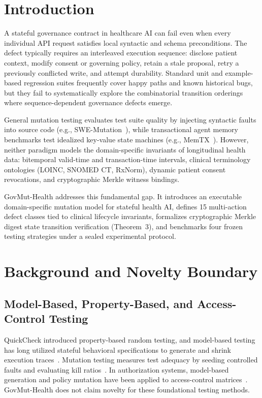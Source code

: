\documentclass[runningheads]{llncs}
\begin{document}
\section{Introduction}
A stateful governance contract in healthcare AI can fail even when every individual API request satisfies local syntactic and schema preconditions. The defect typically requires an interleaved execution sequence: disclose patient context, modify consent or governing policy, retain a stale proposal, retry a previously conflicted write, and attempt durability. Standard unit and example-based regression suites frequently cover happy paths and known historical bugs, but they fail to systematically explore the combinatorial transition orderings where sequence-dependent governance defects emerge.

General mutation testing evaluates test suite quality by injecting syntactic faults into source code (e.g., SWE-Mutation~\cite{swemutation}), while transactional agent memory benchmarks test idealized key-value state machines (e.g., MemTX~\cite{memtx}). However, neither paradigm models the domain-specific invariants of longitudinal health data: bitemporal valid-time and transaction-time intervals, clinical terminology ontologies (LOINC, SNOMED CT, RxNorm), dynamic patient consent revocations, and cryptographic Merkle witness bindings.

GovMut-Health addresses this fundamental gap. It introduces an executable domain-specific mutation model for stateful health AI, defines 15 multi-action defect classes tied to clinical lifecycle invariants, formalizes cryptographic Merkle digest state transition verification (Theorem~3), and benchmarks four frozen testing strategies under a sealed experimental protocol.

\section{Background and Novelty Boundary}
\subsection{Model-Based, Property-Based, and Access-Control Testing}
QuickCheck introduced property-based random testing, and model-based testing has long utilized stateful behavioral specifications to generate and shrink execution traces~\cite{quickcheck,utting}. Mutation testing measures test adequacy by seeding controlled faults and evaluating kill ratios~\cite{jia}. In authorization systems, model-based generation and policy mutation have been applied to access-control matrices~\cite{pretschner2008,xu2012,nist800192}. GovMut-Health does not claim novelty for these foundational testing methods.
\end{document}
